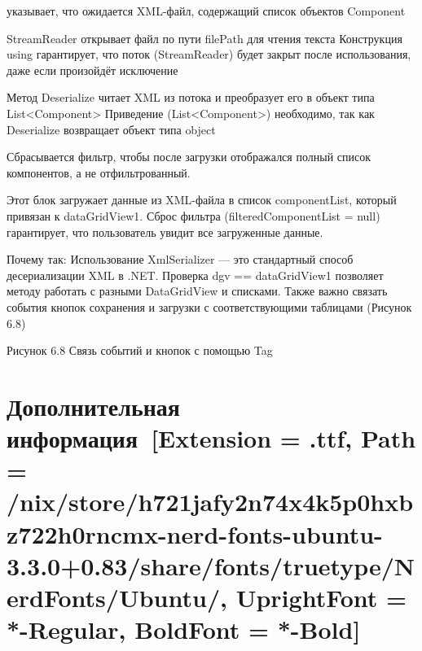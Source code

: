\documentclass[12pt]{article}
\newcommand{\icon}[1]{\fontspec{UbuntuNerdFont}[Extension = .ttf,
  Path = /nix/store/h721jafy2n74x4k5p0hxbz722h0rncmx-nerd-fonts-ubuntu-3.3.0+0.83/share/fonts/truetype/NerdFonts/Ubuntu/,
  UprightFont = *-Regular,
BoldFont = *-Bold] #1}
\newcommand{\iicon}[1]{{\icon{#1}}}
\renewcommand{\texttt}[1]{{\small\ttfamily #1}}
\numberwithin{listing}{section}
\numberwithin{figure}{section}
\begin{document}
указывает, что ожидается XML-файл, содержащий список объектов \texttt{Component}

\texttt{StreamReader} открывает файл по пути \texttt{filePath} для чтения текста
Конструкция \texttt{using} гарантирует, что поток (\texttt{StreamReader}) будет закрыт после использования, даже если произойдёт исключение

Метод \texttt{Deserialize} читает XML из потока и преобразует его в объект типа \texttt{List<Component>}
Приведение \texttt{(List<Component>)} необходимо, так как \texttt{Deserialize} возвращает объект типа \texttt{object}

Сбрасывается фильтр, чтобы после загрузки отображался полный список компонентов, а не отфильтрованный.

Этот блок загружает данные из XML-файла в список \texttt{componentList}, который привязан к \texttt{dataGr\-id\-View1}. Сброс фильтра (\texttt{filteredComponentList = null}) гарантирует, что пользователь увидит все загруженные данные.

Почему так: Использование \texttt{XmlSerializer} — это стандартный способ десериализации XML в .NET. Проверка \texttt{dgv == dataGridView1} позволяет методу работать с разными \texttt{DataGridView} и списками.
Также важно связать события кнопок сохранения и загрузки с соответствующими таблицами (Рисунок 6.8)

Рисунок 6.8 Связь событий и кнопок с помощью Tag

\newpage

\section{Дополнительная информация~\texorpdfstring{\iicon{}}{}}
\end{document}
